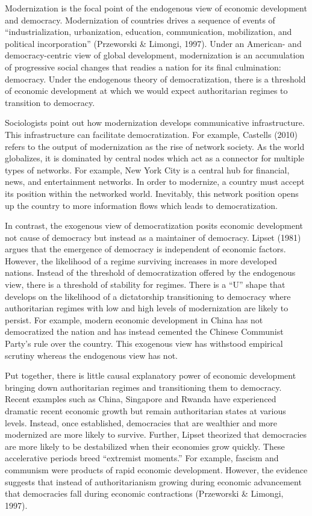 \documentclass[12pt,]{article}
\begin{document}
Modernization is the focal point of the endogenous view of economic
development and democracy. Modernization of countries drives a sequence
of events of ``industrialization, urbanization, education,
communication, mobilization, and political incorporation'' (Przeworski
\& Limongi, 1997). Under an American- and democracy-centric view of
global development, modernization is an accumulation of progressive
social changes that readies a nation for its final culmination:
democracy. Under the endogenous theory of democratization, there is a
threshold of economic development at which we would expect authoritarian
regimes to transition to democracy.

Sociologists point out how modernization develops communicative
infrastructure. This infrastructure can facilitate democratization. For
example, Castells (2010) refers to the output of modernization as the
rise of network society. As the world globalizes, it is dominated by
central nodes which act as a connector for multiple types of networks.
For example, New York City is a central hub for financial, news, and
entertainment networks. In order to modernize, a country must accept its
position within the networked world. Inevitably, this network position
opens up the country to more information flows which leads to
democratization.

In contrast, the exogenous view of democratization posits economic
development not cause of democracy but instead as a maintainer of
democracy. Lipset (1981) argues that the emergence of democracy is
independent of economic factors. However, the likelihood of a regime
surviving increases in more developed nations. Instead of the threshold
of democratization offered by the endogenous view, there is a threshold
of stability for regimes. There is a ``U'' shape that develops on the
likelihood of a dictatorship transitioning to democracy where
authoritarian regimes with low and high levels of modernization are
likely to persist. For example, modern economic development in China has
not democratized the nation and has instead cemented the Chinese
Communist Party's rule over the country. This exogenous view has
withstood empirical scrutiny whereas the endogenous view has not.

Put together, there is little causal explanatory power of economic
development bringing down authoritarian regimes and transitioning them
to democracy. Recent examples such as China, Singapore and Rwanda have
experienced dramatic recent economic growth but remain authoritarian
states at various levels. Instead, once established, democracies that
are wealthier and more modernized are more likely to survive. Further,
Lipset theorized that democracies are more likely to be destabilized
when their economies grow quickly. These accelerative periods breed
``extremist moments.'' For example, fascism and communism were products
of rapid economic development. However, the evidence suggests that
instead of authoritarianism growing during economic advancement that
democracies fall during economic contractions (Przeworski \& Limongi,
1997).
\end{document}
